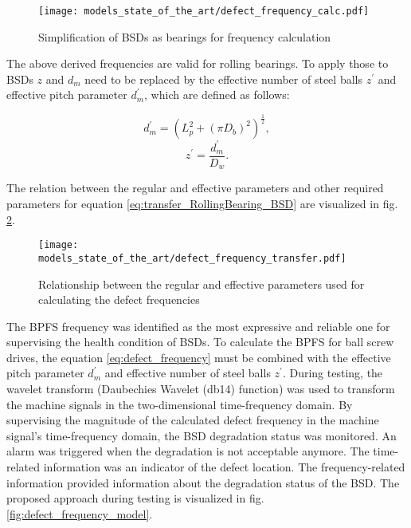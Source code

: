 \begin{figure}[H]
  \centering
  \texttt{[image: models\_state\_of\_the\_art/defect\_frequency\_calc.pdf]}
  \caption{Simplification of BSDs as bearings for frequency calculation \cite{Lee2015}}
  \label{fig:defect_frequency_calc}
\end{figure}

The above derived frequencies are valid for rolling bearings. To apply those to BSDs $z$ and $d_{m}$ need to be replaced by the effective number of steel balls $z^{'}$ and effective pitch parameter $d_{m}^{'}$, which are defined as follows:

\begin{equation} \label{eq:transfer_RollingBearing_BSD}
    d_{m}^{'} = (L_{p}^{2}+(\pi D_{b})^{2})^{\frac{1}{2}},
\end{equation}
\begin{equation}
    z^{'} = \frac{d_{m}^{'}}{D_{w}}.
\end{equation}

The relation between the regular and effective parameters and other required parameters for equation \ref{eq:transfer_RollingBearing_BSD} are visualized in fig. \ref{fig:defect_frequency_transfer}. 

\begin{figure}[H]
  \centering
  \texttt{[image: models\_state\_of\_the\_art/defect\_frequency\_transfer.pdf]}
  \caption{Relationship between the regular and effective parameters used for calculating the defect frequencies \cite{Lee2015}}
  \label{fig:defect_frequency_transfer}
\end{figure}

The BPFS frequency was identified as the most expressive and reliable one for supervising the health condition of BSDs. To calculate the BPFS for ball screw drives, the equation \ref{eq:defect_frequency} must be combined with the effective pitch parameter $d_{m}^{'}$ and effective number of steel balls $z^{'}$. During testing, the wavelet transform (Daubechies Wavelet (db14) function) was used to transform the machine signals in the two-dimensional time-frequency domain. By supervising the magnitude of the calculated defect frequency in the machine signal's time-frequency domain, the BSD degradation status was monitored. An alarm was triggered when the degradation is not acceptable anymore. The time-related information was an indicator of the defect location. The frequency-related information provided information about the degradation status of the BSD. The proposed approach during testing is visualized in fig. \ref{fig:defect_frequency_model}. 


